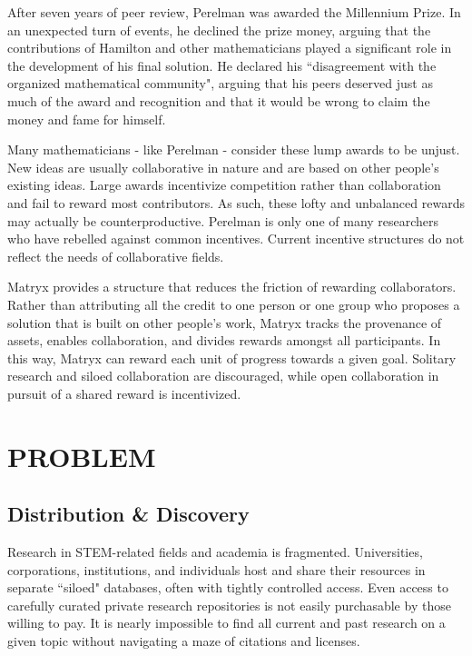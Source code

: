 \documentclass[a4paper, 10pt, conference]{ieeeconf}      %
\begin{document}
After seven years of peer review, Perelman was awarded the Millennium Prize. 
In an unexpected turn of events, he declined the prize money, arguing that the contributions of Hamilton and other mathematicians played a significant role in the development of his final solution. He declared his ``disagreement with the organized mathematical community"\cite{ritter2010}, arguing that his peers deserved just as much of the award and recognition and that it would be wrong to claim the money and fame for himself. 

Many mathematicians - like Perelman - consider these lump awards to be unjust. 
New ideas are usually collaborative in nature and are based on other people's existing ideas.
Large awards incentivize competition rather than collaboration and fail to reward most contributors. As such, these lofty and unbalanced rewards may actually be counterproductive. 
Perelman is only one of many researchers who have rebelled against common incentives. 
Current incentive structures do not reflect the needs of collaborative fields. 

Matryx provides a structure that reduces the friction of rewarding collaborators. 
Rather than attributing all the credit to one person or one group who proposes a solution that is built on other people’s work, Matryx tracks the provenance of assets, enables collaboration, and divides rewards amongst all participants. 
In this way, Matryx can reward each unit of progress towards a given goal. 
Solitary research and siloed collaboration are discouraged, while open collaboration in pursuit of a shared reward is incentivized.


\section{PROBLEM}\label{problem}
\subsection{Distribution \& Discovery}\label{distribution}
Research in STEM-related fields and academia is fragmented. Universities, corporations, institutions, and individuals host and share their resources in separate ``siloed" databases, often with tightly controlled access. 
Even access to carefully curated private research repositories is not easily purchasable by those willing to pay. 
It is nearly impossible to find all current and past research on a given topic without navigating a maze of citations and licenses.
\end{document}
